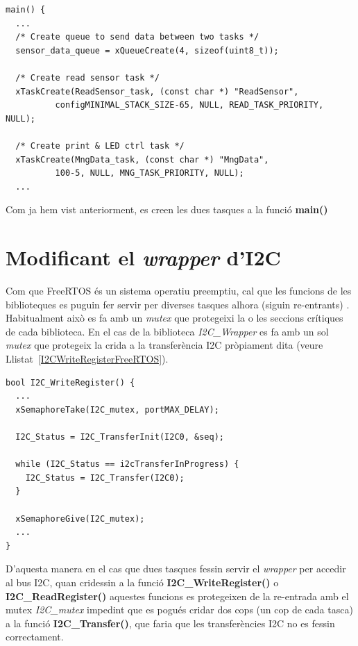 \begin{lstlisting}[style=customc,caption={Creació de tasques},label=createtasks]
main() {
  ...
  /* Create queue to send data between two tasks */
  sensor_data_queue = xQueueCreate(4, sizeof(uint8_t));

  /* Create read sensor task */
  xTaskCreate(ReadSensor_task, (const char *) "ReadSensor",
          configMINIMAL_STACK_SIZE-65, NULL, READ_TASK_PRIORITY, NULL);

  /* Create print & LED ctrl task */
  xTaskCreate(MngData_task, (const char *) "MngData",
          100-5, NULL, MNG_TASK_PRIORITY, NULL);
  ...
\end{lstlisting}

Com ja hem vist anteriorment, es creen les dues tasques a la funció {\bf main()}

\section{Modificant el {\em wrapper} d'I2C}
\label{sec:wrapperI2C}
Com que FreeRTOS és un sistema operatiu preemptiu, cal que les funcions de les biblioteques es puguin fer servir per diverses tasques alhora (siguin re-entrants) \cite[236]{FreeRTOSBook}. Habitualment això es fa amb un {\em mutex} que protegeixi la o les seccions crítiques de cada biblioteca. En el cas de la biblioteca {\em I2C\_Wrapper} es fa amb un sol {\em mutex} que protegeix la crida a la transferència \gls{I2C} pròpiament dita (veure Llistat~\ref{I2CWriteRegisterFreeRTOS}).

\begin{lstlisting}[style=customc,caption={Part de la funció I2C\_WriteRegister() adaptada a FreeRTOS}, label=I2CWriteRegisterFreeRTOS]
bool I2C_WriteRegister() {
  ...
  xSemaphoreTake(I2C_mutex, portMAX_DELAY);

  I2C_Status = I2C_TransferInit(I2C0, &seq);

  while (I2C_Status == i2cTransferInProgress) {
    I2C_Status = I2C_Transfer(I2C0);
  }

  xSemaphoreGive(I2C_mutex);
  ...
}
\end{lstlisting}

D'aquesta manera en el cas que dues tasques fessin servir el {\em wrapper} per accedir al bus \gls{I2C}, quan cridessin a la funció {\bf I2C\_WriteRegister()} o {\bf I2C\_ReadRegister()} aquestes funcions es protegeixen de la re-entrada amb el mutex {\em I2C\_mutex} impedint que es pogués cridar dos cops (un cop de cada tasca) a la funció {\bf I2C\_Transfer()}, que faria que les transferències \gls{I2C} no es fessin correctament.

